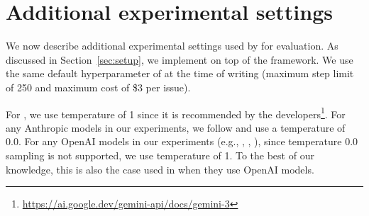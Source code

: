 \section{Additional experimental settings}
\label{appendix:additional_experimental_settings}

We now describe additional experimental settings used by \tech for evaluation.
As discussed in Section~\ref{sec:setup}, we implement \tech on top of the \minisweagent framework.
We use the same default hyperparameter of \minisweagent at the time of writing (maximum step limit of 250 and maximum cost of \$3 per issue).

For \geminithreepro{}, we use temperature of 1 since it is recommended by the developers\footnote{\url{https://ai.google.dev/gemini-api/docs/gemini-3}}.
For any Anthropic models in our experiments, we follow \minisweagent and use a temperature of 0.0.
For any OpenAI models in our experiments (e.g., \gptfive, \gptfivemini, \gptfivenano), since temperature 0.0 sampling is not supported, we use temperature of 1.
To the best of our knowledge, this is also the case used in \minisweagent when they use OpenAI models.
